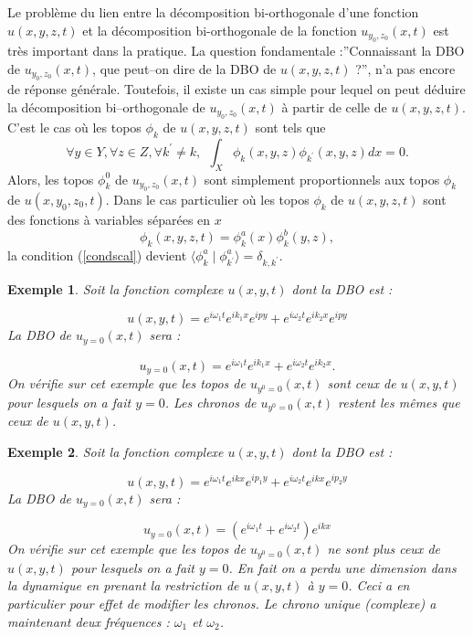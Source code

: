 \documentclass{book}
\newtheorem{exmp}{Exemple}[chapter]
\begin{document}
Le probl\`eme du lien entre la d\'ecomposition bi-orthogonale d'une
fonction $u(x,y,z,t)$ et la d\'ecomposition bi-orthogonale de la
fonction $u_{y_0,z_0}(x,t)$ est tr\`es important dans la pratique.
La question fondamentale :''Connaissant la DBO de  $u_{y_0,z_0}(x,t)$,
que peut--on dire de la DBO de $u(x,y,z,t)$ ?'', n'a pas encore de
r\'eponse g\'en\'erale. 
Toutefois, il existe un cas simple pour lequel on peut d\'eduire la
d\'ecomposition bi--orthogonale de $u_{y_0,z_0}(x,t)$ \`a partir de
celle de
$u(x,y,z,t)$. C'est le cas o\`u les topos $\phi_k$ de $u(x,y,z,t)$ sont 
tels que 
\begin{equation}\label{condscal}
\forall y\in Y, \forall z\in Z, \forall k^\prime\neq k,\ \ \int_X
\phi_k(x,y,z) \phi_{k^\prime}(x,y,z)dx =0.  
\end{equation}
Alors, les  topos
$\phi_k^0$ de $u_{y_0,z_0}(x,t)$ sont simplement proportionnels aux
topos  $\phi_k$ de $u(x,y_0,z_0,t)$.
Dans le cas particulier o\`u les topos  $\phi_k$ de $u(x,y,z,t)$ sont
des fonctions \`a variables s\'epar\'ees en $x$
\begin{equation}
\phi_k(x,y,z,t)=\phi_k^a(x)\phi_k^b(y,z),
\end{equation}
la condition (\ref{condscal}) devient
$\langle \phi_k^a\mid \phi^a_{k^\prime}\rangle =\delta_{k,k^\prime}$. 
\begin{exmp}
Soit la  fonction complexe $u(x,y,t)$ dont la DBO est :

\begin{equation}
u(x,y,t)=e^{i\omega_1t}e^{i k_1x}e^{i p y}+e^{i\omega_2t}e^{i k_2x}e^{i p y}
\end{equation}
La DBO de  $u_{y=0}(x,t)$ sera :


\begin{equation}
u_{y=0}(x,t)=e^{i\omega_1t}e^{i k_1x}+e^{i\omega_2t}e^{i k_2x}.
\end{equation}
On v\'erifie sur cet exemple que les topos de $u_{y^0=0}(x,t)$ sont
ceux de $u(x,y,t)$ pour lesquels on a fait $y=0$. Les chronos de
$u_{y^0=0}(x,t)$ restent les m\^emes que ceux de $u(x,y,t)$.
\end{exmp}


\begin{exmp}
Soit la  fonction complexe $u(x,y,t)$ dont la DBO est :

\begin{equation}
u(x,y,t)=e^{i\omega_1t}e^{i k x}e^{i p_1y}+e^{i\omega_2t}e^{i k x}e^{i p_2y}
\end{equation}
La DBO de  $u_{y=0}(x,t)$ sera :


\begin{equation}
u_{y=0}(x,t)=(e^{i\omega_1t}+e^{i\omega_2t})e^{i k x}
\end{equation}
On v\'erifie sur cet exemple que les topos de $u_{y^0=0}(x,t)$ ne sont
plus 
ceux de $u(x,y,t)$ pour lesquels on a fait $y=0$. En fait on a perdu
une dimension dans la dynamique en prenant la restriction de
$u(x,y,t)$ \`a 
$y=0$. Ceci a en particulier pour effet de modifier les chronos. Le
chrono unique (complexe) a maintenant deux fr\'equences : $\omega_1$ et
$\omega_2$. 
\end{exmp}
\end{document}
